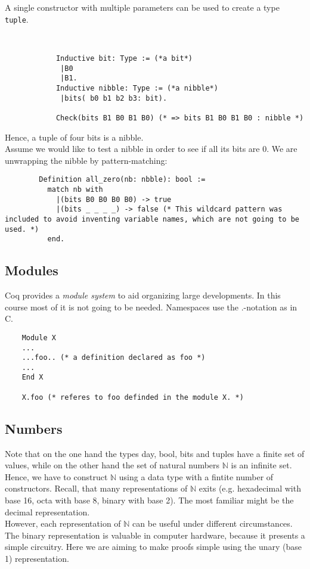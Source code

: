     A single constructor with multiple parameters can be used to create a type \lstinline! tuple!.
	\begin{example}~\\\vspace{-10mm}
 	 	{\normalfont \begin{lstlisting}
 	 		Inductive bit: Type := (*a bit*) 
 	 		 |B0
 	 		 |B1.
 		    Inductive nibble: Type := (*a nibble*)
 		   	 |bits( b0 b1 b2 b3: bit).
 		   			 	
 		   	Check(bits B1 B0 B1 B0) (* => bits B1 B0 B1 B0 : nibble *)
 		\end{lstlisting}
 		Hence, a tuple of four bits is a nibble.\\ 		
 		Assume we would like to test a nibble in order to see if all its bits are 0. 
 		We are unwrapping the nibble by pattern-matching:
 		\begin{lstlisting}
 		Definition all_zero(nb: nbble): bool :=
 		  match nb with
 	  	    |(bits B0 B0 B0 B0) -> true
 		    |(bits _ _ _ _) -> false (* This wildcard pattern was included to avoid inventing variable names, which are not going to be used. *) 
 		  end.
 		 \end{lstlisting}}
 	\end{example}
 	

\subsection{Modules}

	Coq provides a {\itshape module system} to aid organizing large developments.
	In this course most of it is not going to be needed. Namespaces use the $.$-notation as in C.

	\begin{lstlisting}
	Module X 
	...
	...foo.. (* a definition declared as foo *)
	...
	End X
	
	X.foo (* referes to foo definded in the module X. *)
	\end{lstlisting}

\subsection{Numbers}

  Note that on the one hand the types day, bool, bits and tuples have a finite set of values, while on the other hand the set of natural numbers $\mathbb{N}$ is an infinite set.\\ 
  Hence, we have to construct $\mathbb{N}$ using a data type with a fintite number of constructors. 
  Recall, that many representations of $\mathbb{N}$ exits (e.g. hexadecimal with base 16, octa with base 8, binary with base 2).
  The most familiar might be the decimal representation.\\
  However, each representation of $\mathbb{N}$ can be useful under different circumstances. 
  The binary representation is valuable in computer hardware, because it presents a simple circuitry.
  Here we are aiming to make proofs simple using the unary (base 1) representation.
  
